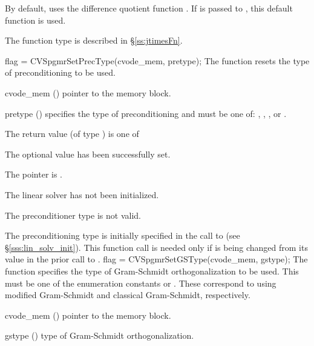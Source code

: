 {
  By default, {\cvspgmr} uses the difference quotient function .
  If  is passed to , this default function is used.

  The function type  is described in \S\ref{ss:jtimesFn}.
}
{
  flag = CVSpgmrSetPrecType(cvode\_mem, pretype);
}
{
  The function  resets the type
  of preconditioning to be used.
}
{
  \begin{args}
  \item[cvode\_mem] ()
    pointer to the {\cvodes} memory block.
  \item[pretype] ()
    specifies the type of preconditioning and must be one of:
    , , , or .
  \end{args}
}
{
  The return value  (of type ) is one of
  \begin{args}
  \item[\Id{CVSPGMR\_SUCCESS}] 
    The optional value has been successfully set.
  \item[\Id{CVSPGMR\_MEM\_NULL}]
    The  pointer is .
  \item[\Id{CVSPGMR\_LMEM\_NULL}]
    The {\cvspgmr} linear solver has not been initialized.
  \item[\Id{CVSPGMR\_ILL\_INPUT}]
    The preconditioner type  is not valid.
  \end{args}
}
{
  The preconditioning type is initially specified in the call
  to  (see \S\ref{sss:lin_solv_init}). This function call is
  needed only if  is being changed from its value in the
  prior call to .
}
{
  flag = CVSpgmrSetGSType(cvode\_mem, gstype);
}
{
  The function  specifies the type of
  Gram-Schmidt orthogonalization to be used. 
  This must be one of the enumeration constants 
  or . These correspond to using modified Gram-Schmidt 
  and classical Gram-Schmidt, respectively. 
}
{
  \begin{args}
  \item[cvode\_mem] ()
    pointer to the {\cvodes} memory block.
  \item[gstype] ()
    type of Gram-Schmidt orthogonalization.
  \end{args}
}
